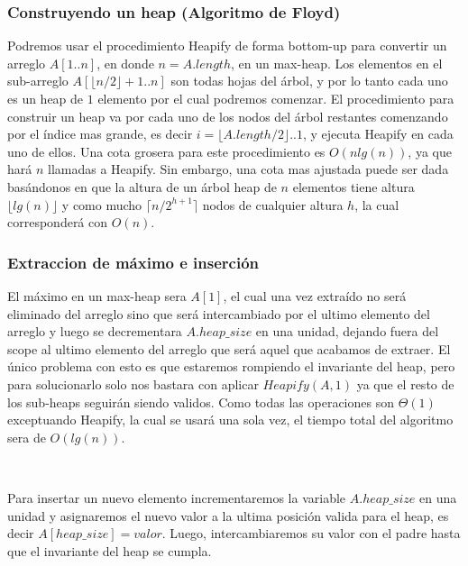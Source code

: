 \subsubsection{Construyendo un heap (Algoritmo de Floyd)}

Podremos usar el procedimiento Heapify de forma bottom-up para convertir un arreglo $A[1..n]$, en donde $n=A.length$, en un max-heap. Los elementos en el sub-arreglo $A[\lfloor n/2\rfloor + 1 .. n]$ son todas hojas del \'arbol, y por lo tanto cada uno es un heap de $1$ elemento por el cual podremos comenzar. El procedimiento para construir un heap va por cada uno de los nodos del \'arbol restantes comenzando por el \'indice mas grande, es decir $i = \lfloor A.length/2 \rfloor .. 1$, y ejecuta Heapify en cada uno de ellos. Una cota grosera para este procedimiento es $O(nlg(n))$, ya que har\'a $n$ llamadas a Heapify. Sin embargo, una cota mas ajustada puede ser dada bas\'andonos en que la altura de un \'arbol heap de $n$ elementos tiene altura $\lfloor lg(n) \rfloor$ y como mucho $\lceil n/2^{h+1}\rceil$ nodos de cualquier altura $h$, la cual corresponder\'a con $O(n)$.


\subsubsection{Extraccion de m\'aximo e inserci\'on}

El m\'aximo en un max-heap sera $A[1]$, el cual una vez extra\'ido no ser\'a eliminado del arreglo sino que ser\'a intercambiado por el ultimo elemento del arreglo y luego se decrementara $A.heap\_size$ en una unidad, dejando fuera del scope al ultimo elemento del arreglo que ser\'a aquel que acabamos de extraer. El \'unico problema con esto es que estaremos rompiendo el invariante del heap, pero para solucionarlo solo nos bastara con aplicar $Heapify(A,1)$ ya que el resto de los sub-heaps seguir\'an siendo validos. Como todas las operaciones son $\Theta(1)$ exceptuando Heapify, la cual se usar\'a una sola vez, el tiempo total del algoritmo sera de $O(lg(n))$.


~

Para insertar un nuevo elemento incrementaremos la variable $A.heap\_size$ en una unidad y asignaremos el nuevo valor a la ultima posici\'on valida para el heap, es decir $A[heap\_size] = valor$. Luego, intercambiaremos su valor con el padre hasta que el invariante del heap se cumpla.

